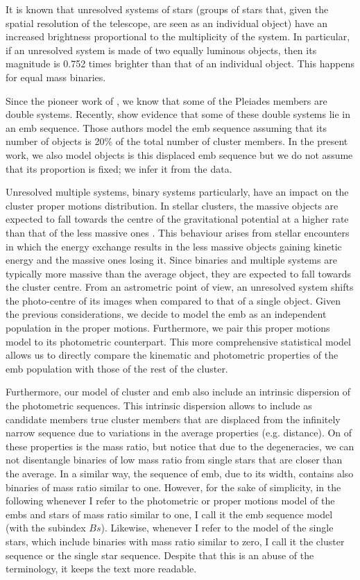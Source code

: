 It is known that unresolved systems of stars (groups of stars that, given the spatial resolution of the telescope, are seen as an individual object) have an increased brightness proportional to the multiplicity of the system. In particular, if an unresolved system is made of two equally luminous objects, then its magnitude is 0.752 times brighter than that of an individual object. This happens for equal mass binaries.

Since the pioneer work of \citet{Trumpler1921}, we know that some of the Pleiades members are double systems. Recently, \citet{Sarro2014} show evidence that some of these double systems lie in an \gls{emb} sequence. Those authors model the \gls{emb} sequence assuming that its number of objects is 20\% of the total number of cluster members. In the present work, we also model objects is this displaced \gls{emb} sequence  but we do not assume that its proportion is fixed; we infer it from the data. 

Unresolved multiple systems, binary systems particularly, have an impact on the cluster proper motions distribution. In stellar clusters, the massive objects are expected to fall towards the centre of the gravitational potential at a higher rate than that of the less massive ones {\cite[see for example][p. 556]{Binney2008}}. This behaviour arises from stellar encounters in which the energy exchange results in the less massive objects gaining kinetic energy and the massive ones losing it. Since binaries and multiple systems are typically more massive than the average object, they are expected to fall towards the cluster centre. From an astrometric point of view, an unresolved system shifts the photo-centre of its images when compared to that of a single object. Given the previous considerations, we decide to model the \gls{emb} as an independent population in the proper motions. Furthermore, we pair this proper motions model to its photometric counterpart. This more comprehensive statistical model allows us to directly compare the kinematic and photometric properties of the \gls{emb} population with those of the rest of the cluster. 

Furthermore, our model of cluster and \gls{emb} also include an intrinsic dispersion of the photometric sequences. This intrinsic dispersion allows to include as candidate members true cluster members that are displaced from the infinitely narrow sequence due to variations in the average properties (e.g. distance). On of these properties is the mass ratio, but notice that due to the degeneracies, we can not disentangle binaries of low mass ratio from single stars that are closer than the average. In a similar way, the sequence of \gls{emb}, due to its width, contains also binaries of mass ratio similar to one. However, for the sake of simplicity, in the following whenever I refer to the photometric or proper motions model of the \glspl{emb} and stars of mass ratio similar to one, I call it the \gls{emb} sequence model (with the subindex $Bs$). Likewise, whenever I refer to the model of the single stars, which include binaries with mass ratio similar to zero, I call it the cluster sequence or the single star sequence. Despite that this is an abuse of the terminology, it keeps the text more readable.

